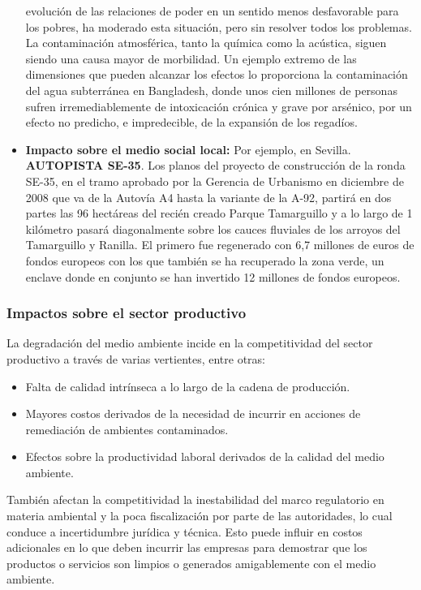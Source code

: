 \begin{itemize}
	      evolución de las relaciones de poder en un sentido menos desfavorable para los
	      pobres, ha moderado esta situación, pero sin resolver todos los problemas. La
	      contaminación atmosférica, tanto la química como la acústica, siguen siendo una
	      causa mayor de morbilidad. Un ejemplo extremo de las dimensiones que pueden
	      alcanzar los efectos lo proporciona la contaminación del agua subterránea
	      en Bangladesh, donde unos cien millones de personas sufren irremediablemente de
	      intoxicación crónica y grave por arsénico, por un efecto no predicho, e impredecible,
	      de la expansión de los regadíos.
	\item \textbf{Impacto sobre el medio social local:} Por ejemplo, en Sevilla. \textbf{AUTOPISTA SE-35}. Los planos del proyecto de
	      construcción de la ronda SE-35, en el tramo aprobado por la Gerencia de Urbanismo en diciembre de 2008 que va de la Autovía A4 hasta la variante de la A-92, partirá en dos
	      partes las 96 hectáreas del recién creado Parque Tamarguillo y a lo largo de 1 kilómetro
	      pasará diagonalmente sobre los cauces fluviales de los arroyos del Tamarguillo y
	      Ranilla. El primero fue regenerado con 6,7 millones de euros de fondos europeos con
	      los que también se ha recuperado la zona verde, un enclave donde en conjunto se han
	      invertido 12 millones de fondos europeos.
\end{itemize}

\subsubsection{Impactos sobre el sector productivo}
La degradación del medio ambiente incide en la competitividad del sector
productivo a través de varias vertientes, entre otras:

\begin{itemize}
	\item Falta de calidad intrínseca a lo largo de la cadena de producción.
	\item Mayores costos derivados de la necesidad de incurrir en acciones de
	      remediación de ambientes contaminados.
	\item Efectos sobre la productividad laboral derivados de la calidad del medio
	      ambiente.
\end{itemize}

También afectan la competitividad la inestabilidad del marco regulatorio en
materia ambiental y la poca fiscalización por parte de las autoridades, lo cual conduce a
incertidumbre jurídica y técnica. Esto puede influir en costos adicionales en lo que
deben incurrir las empresas para demostrar que los productos o servicios son limpios o
generados amigablemente con el medio ambiente.

